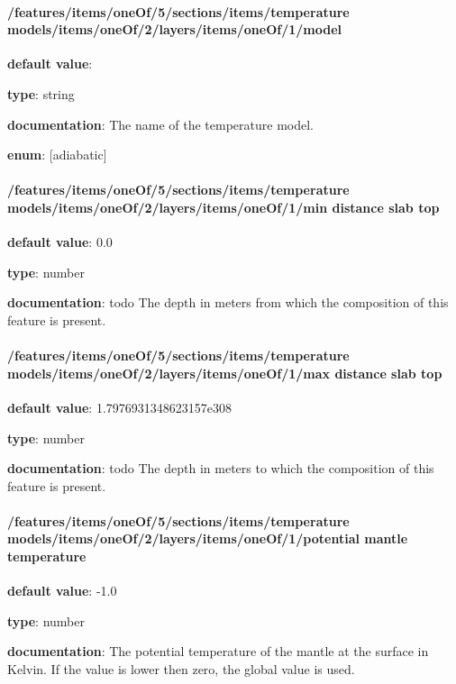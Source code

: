 \paragraph{/features/items/oneOf/5/sections/items/temperature models/items/oneOf/2/layers/items/oneOf/1/model} \begin{itemized}
\item {\bf default value}: 
\item {\bf type}: string
\item {\bf documentation}: The name of the temperature model.
\item {\bf enum}: [adiabatic]\end{itemized}\paragraph{/features/items/oneOf/5/sections/items/temperature models/items/oneOf/2/layers/items/oneOf/1/min distance slab top} \begin{itemized}
\item {\bf default value}: 0.0
\item {\bf type}: number
\item {\bf documentation}: todo The depth in meters from which the composition of this feature is present.
\end{itemized}\paragraph{/features/items/oneOf/5/sections/items/temperature models/items/oneOf/2/layers/items/oneOf/1/max distance slab top} \begin{itemized}
\item {\bf default value}: 1.7976931348623157e308
\item {\bf type}: number
\item {\bf documentation}: todo The depth in meters to which the composition of this feature is present.
\end{itemized}\paragraph{/features/items/oneOf/5/sections/items/temperature models/items/oneOf/2/layers/items/oneOf/1/potential mantle temperature} \begin{itemized}
\item {\bf default value}: -1.0
\item {\bf type}: number
\item {\bf documentation}: The potential temperature of the mantle at the surface in Kelvin. If the value is lower then zero, the global value is used.

\end{itemized}
